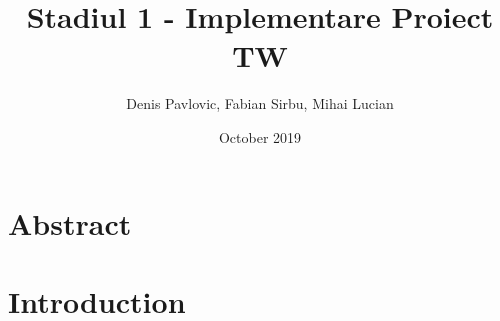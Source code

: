 \documentclass[a4paper12pt]{article}
\title{Stadiul 1 - Implementare Proiect TW}
\author{Denis Pavlovic, Fabian Sirbu, Mihai Lucian}
\date{October 2019}
\begin{document}
\maketitle
\newpage

\tableofcontents

\newpage
\vspace{2.5cm}
\section{Abstract}

\newpage
\section{Introduction}
\end{document}
